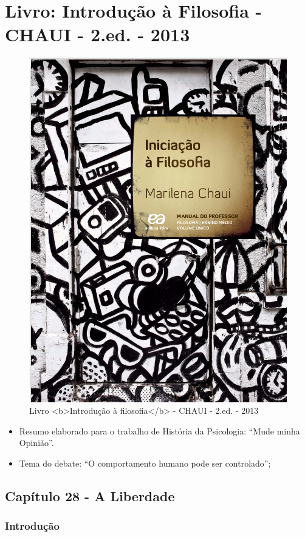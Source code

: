 \documentclass[
]{book}
\providecommand{\tightlist}{%
  \setlength{\itemsep}{0pt}\setlength{\parskip}{0pt}}
\begin{document}
\hypertarget{livro-introduuxe7uxe3o-uxe0-filosofia---chaui---2.ed.---2013}{%
\section{Livro: Introdução à Filosofia - CHAUI - 2.ed. - 2013}\label{livro-introduuxe7uxe3o-uxe0-filosofia---chaui---2.ed.---2013}}

\begin{figure}

{\centering \includegraphics[width=0.5\linewidth]{imagens/Capa-Livro-Introducao-a-Filosofia-MARILENA-CHAUI} 

}

\caption{Livro <b>Introdução à filosofia</b> - CHAUI - 2.ed. - 2013}\label{fig:unnamed-chunk-2}
\end{figure}

\begin{itemize}
\tightlist
\item
  Resumo elaborado para o trabalho de História da Psicologia: ``Mude minha Opinião''.
\item
  Tema do debate: ``O comportamento humano pode ser controlado'';
\end{itemize}

\hypertarget{capuxedtulo-28---a-liberdade}{%
\subsection{Capítulo 28 - A Liberdade}\label{capuxedtulo-28---a-liberdade}}

\hypertarget{introduuxe7uxe3o}{%
\subsubsection{Introdução}\label{introduuxe7uxe3o}}
\end{document}
